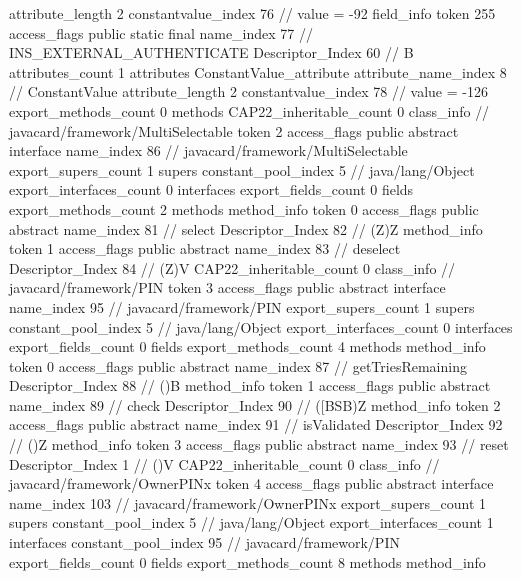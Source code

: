 {{{{{{{					attribute_length	2
					constantvalue_index	76		// value = -92
				}
				}
			}
			field_info {
				token	255
				access_flags	public static final
				name_index	77		// INS_EXTERNAL_AUTHENTICATE
				Descriptor_Index	60		// B
				attributes_count	1
				attributes {
				ConstantValue_attribute {
					attribute_name_index	8		// ConstantValue
					attribute_length	2
					constantvalue_index	78		// value = -126
				}
				}
			}
			}
			export_methods_count	0
			methods {
			}
			CAP22_inheritable_count	0
		}
		class_info {		// javacard/framework/MultiSelectable
			token	2
			access_flags	public abstract interface
			name_index	86		// javacard/framework/MultiSelectable
			export_supers_count	1
			supers {
				constant_pool_index	5		// java/lang/Object
			}
			export_interfaces_count	0
			interfaces {
			}
			export_fields_count	0
			fields {
			}
			export_methods_count	2
			methods {
				method_info {
					token	0
					access_flags	public abstract
					name_index	81		// select
					Descriptor_Index	82		// (Z)Z
				}
				method_info {
					token	1
					access_flags	public abstract
					name_index	83		// deselect
					Descriptor_Index	84		// (Z)V
				}
			}
			CAP22_inheritable_count	0
		}
		class_info {		// javacard/framework/PIN
			token	3
			access_flags	public abstract interface
			name_index	95		// javacard/framework/PIN
			export_supers_count	1
			supers {
				constant_pool_index	5		// java/lang/Object
			}
			export_interfaces_count	0
			interfaces {
			}
			export_fields_count	0
			fields {
			}
			export_methods_count	4
			methods {
				method_info {
					token	0
					access_flags	public abstract
					name_index	87		// getTriesRemaining
					Descriptor_Index	88		// ()B
				}
				method_info {
					token	1
					access_flags	public abstract
					name_index	89		// check
					Descriptor_Index	90		// ([BSB)Z
				}
				method_info {
					token	2
					access_flags	public abstract
					name_index	91		// isValidated
					Descriptor_Index	92		// ()Z
				}
				method_info {
					token	3
					access_flags	public abstract
					name_index	93		// reset
					Descriptor_Index	1		// ()V
				}
			}
			CAP22_inheritable_count	0
		}
		class_info {		// javacard/framework/OwnerPINx
			token	4
			access_flags	public abstract interface
			name_index	103		// javacard/framework/OwnerPINx
			export_supers_count	1
			supers {
				constant_pool_index	5		// java/lang/Object
			}
			export_interfaces_count	1
			interfaces {
				constant_pool_index	95		// javacard/framework/PIN
			}
			export_fields_count	0
			fields {
			}
			export_methods_count	8
			methods {
				method_info {
}}}}}
